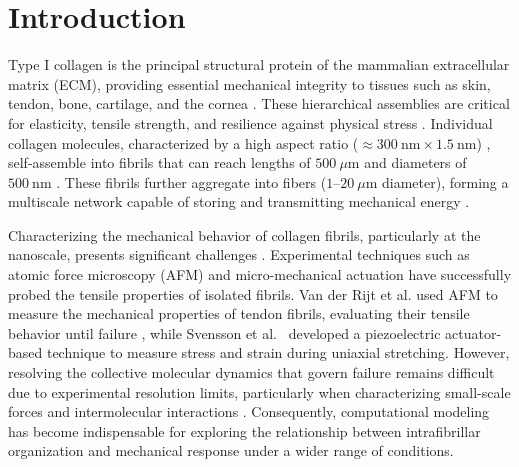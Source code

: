 \documentclass[aps,physrev,preprint,groupedaddress,linenumbers]{revtex4-2}
\begin{document}

\maketitle

\section{Introduction}

Type I collagen is the principal structural protein of the mammalian extracellular matrix (ECM), providing essential mechanical integrity to tissues such as skin, tendon, bone, cartilage, and the cornea \cite{Silver2018,DavisonKotler2019,Tresoldi2013,Fedarko2014, RicoLlanos2021,Chen2015,Suki2021}. These hierarchical assemblies are critical for elasticity, tensile strength, and resilience against physical stress \cite{Silver2018,Amirrah2022}. Individual collagen molecules, characterized by a high aspect ratio ($\approx 300~\text{nm} \times 1.5~\text{nm}$) \cite{Gelse2003, Silver2018}, self-assemble into fibrils that can reach lengths of $500~\mu\text{m}$ and diameters of $500~\text{nm}$ \cite{Charvolin2019,Kadler1996, Parry1984}. These fibrils further aggregate into fibers ($1$--$20~\mu\text{m}$ diameter), forming a multiscale network capable of storing and transmitting mechanical energy \cite{Silver2008,Suki2021}.

Characterizing the mechanical behavior of collagen fibrils, particularly at the nanoscale, presents significant challenges \cite{Nalbach2022}. Experimental techniques such as atomic force microscopy (AFM) and micro-mechanical actuation have successfully probed the tensile properties of isolated fibrils. Van der Rijt et al. used AFM to measure the mechanical properties of tendon fibrils, evaluating their tensile behavior until failure \cite{vanderRijt2006}, while Svensson et al.~\cite{Svensson2018} developed a piezoelectric actuator-based technique to measure stress and strain during uniaxial stretching. However, resolving the collective molecular dynamics that govern failure remains difficult due to experimental resolution limits, particularly when characterizing small-scale forces and intermolecular interactions \cite{Andriotis2023}. Consequently, computational modeling has become indispensable for exploring the relationship between intrafibrillar organization and mechanical response under a wider range of conditions.
\end{document}
